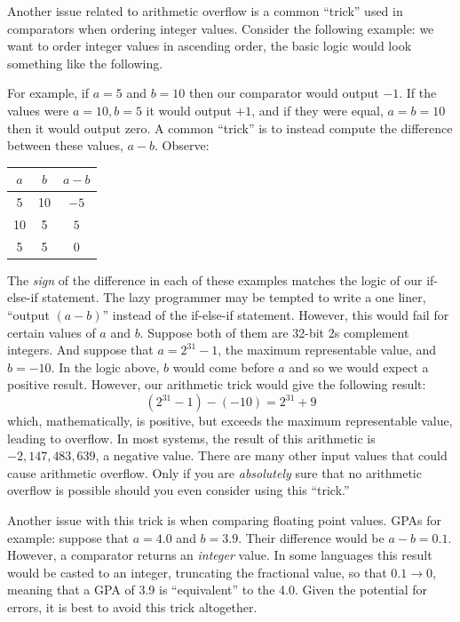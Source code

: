 Another issue related to arithmetic overflow is a common ``trick'' 
used in comparators when ordering integer values.  Consider the following
example: we want to order integer values in ascending order, the basic
logic would look something like the following.

\begin{algorithm}[H]
\end{algorithm}

For example, if $a = 5$ and $b = 10$ then our comparator would output $-1$.  If
the values were $a = 10, b = 5$ it would output $+1$, and if they were
equal, $a = b = 10$ then it would output zero.  A common ``trick'' is to
instead compute the difference between these values, $a - b$.  Observe:

\begin{center}
\begin{tabular}{ccc}
$a$ & $b$ & $a - b$ \\
\hline\hline
5 & 10 & $-5$ \\
10 & 5 & $5$ \\
5 & 5 & $0$ \\
\end{tabular}
\end{center}

The \emph{sign} of the difference in each of these examples matches the 
logic of our if-else-if statement.  The lazy programmer may be tempted to
write a one liner, ``output $(a - b)$'' instead of the if-else-if statement.
However, this would fail for certain values of $a$ and $b$.  Suppose 
both of them are 32-bit 2s complement integers.  And suppose that 
$a = 2^{31} - 1$, the maximum representable value, and $b = -10$.  In
the logic above, $b$ would come before $a$ and so we would expect a 
positive result.  However, our arithmetic trick would give the following 
result:
  $$(2^{31} - 1) - (-10) = 2^{31} + 9$$
which, mathematically, is positive, but exceeds the maximum representable
value, leading to overflow.  In most systems, the result of this arithmetic
is $-2,147,483,639$, a negative value.  There are many other input values
that could cause arithmetic overflow.  Only if you are \emph{absolutely} 
sure that no arithmetic overflow is possible should you even consider
using this ``trick.''

Another issue with this trick is when comparing floating point values.
GPAs for example: suppose that $a = 4.0$ and $b = 3.9$.  Their difference
would be $a - b = 0.1$.  However, a comparator returns an \emph{integer}
value.  In some languages this result would be casted to an integer, 
truncating the fractional value, so that $0.1 \rightarrow 0$, meaning
that a GPA of 3.9 is ``equivalent'' to the 4.0. Given the potential for 
errors, it is best to avoid this trick altogether.

